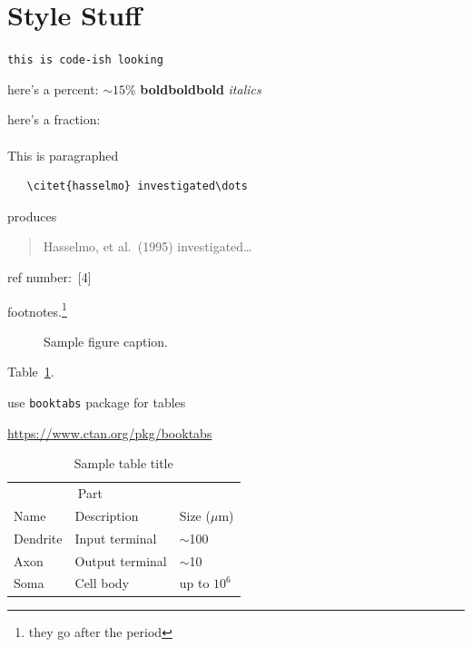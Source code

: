 \documentclass{article}
\begin{document}
\section{Style Stuff}
\verb+this is code-ish looking+ 

here's a percent: $\sim$$15\%$
\textbf{boldboldbold}
\emph{italics}

here's a fraction: 

\paragraph{}This is paragraphed
\begin{verbatim}
   \citet{hasselmo} investigated\dots
\end{verbatim}
produces
\begin{quote}
  Hasselmo, et al.\ (1995) investigated\dots
\end{quote}

ref number:\ [4]

footnotes.\footnote{they go after the period}

\begin{figure}[h]
  \centering
  \fbox{\rule[-.5cm]{0cm}{4cm} \rule[-.5cm]{4cm}{0cm}}
  \caption{Sample figure caption.}
\end{figure}

Table~\ref{sample-table}.

use \verb+booktabs+ package for tables
\begin{center}
  \url{https://www.ctan.org/pkg/booktabs}
\end{center}

\begin{table}[t]
  \caption{Sample table title}
  \label{sample-table}
  \centering
  \begin{tabular}{lll}
    \toprule
    \multicolumn{2}{c}{Part}                   \\
    \cmidrule{1-2}
    Name     & Description     & Size ($\mu$m) \\
    \midrule
    Dendrite & Input terminal  & $\sim$100     \\
    Axon     & Output terminal & $\sim$10      \\
    Soma     & Cell body       & up to $10^6$  \\
    \bottomrule
  \end{tabular}
\end{table}
\end{document}

